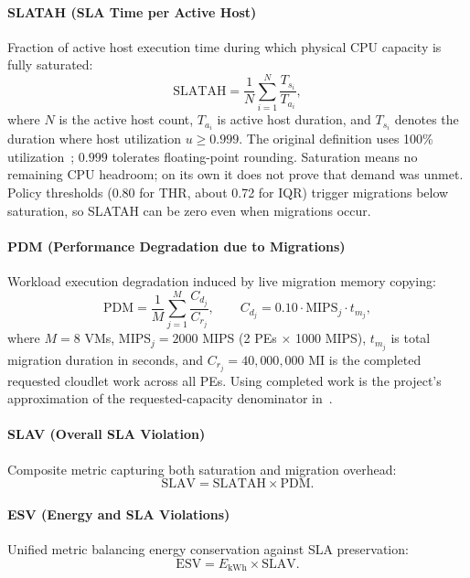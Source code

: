 \documentclass[11pt,a4paper]{article}
\begin{document}
\paragraph{SLATAH (SLA Time per Active Host)} Fraction of active host execution time during which physical CPU capacity is fully saturated:
\begin{equation}
\mathrm{SLATAH} = \frac{1}{N}\sum_{i=1}^{N}\frac{T_{s_i}}{T_{a_i}},
\end{equation}
where $N$ is the active host count, $T_{a_i}$ is active host duration, and $T_{s_i}$ denotes the duration where host utilization $u \ge 0.999$. The original definition uses 100\% utilization~\cite{beloglazov2012ccpe}; $0.999$ tolerates floating-point rounding. Saturation means no remaining CPU headroom; on its own it does not prove that demand was unmet. Policy thresholds (0.80 for THR, about 0.72 for IQR) trigger migrations below saturation, so SLATAH can be zero even when migrations occur.

\paragraph{PDM (Performance Degradation due to Migrations)} Workload execution degradation induced by live migration memory copying:
\begin{equation}
\mathrm{PDM} = \frac{1}{M}\sum_{j=1}^{M}\frac{C_{d_j}}{C_{r_j}}, \qquad C_{d_j} = 0.10 \cdot \text{MIPS}_j \cdot t_{m_j},
\end{equation}
where $M=8$ VMs, $\text{MIPS}_j = 2000$ MIPS (2 PEs $\times$ 1000 MIPS), $t_{m_j}$ is total migration duration in seconds, and $C_{r_j} = 40{,}000{,}000$ MI is the completed requested cloudlet work across all PEs. Using completed work is the project's approximation of the requested-capacity denominator in~\cite{beloglazov2012ccpe}.

\paragraph{SLAV (Overall SLA Violation)} Composite metric capturing both saturation and migration overhead:
\begin{equation}
\mathrm{SLAV} = \mathrm{SLATAH} \times \mathrm{PDM}.
\end{equation}

\paragraph{ESV (Energy and SLA Violations)} Unified metric balancing energy conservation against SLA preservation:
\begin{equation}
\mathrm{ESV} = E_{\text{kWh}} \times \mathrm{SLAV}.
\end{equation}
\end{document}

